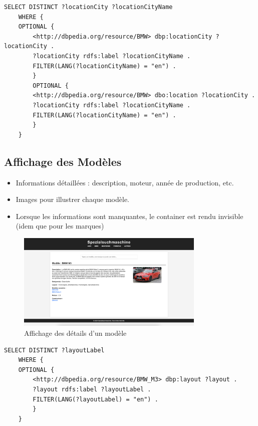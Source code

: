 \documentclass[a4paper]{article}
\begin{document}
\begin{lstlisting}[language=SPARQL, caption=Requêtes SPARQL pour rechercher la ville d'une marque]
    SELECT DISTINCT ?locationCity ?locationCityName
    WHERE {
    OPTIONAL {
        <http://dbpedia.org/resource/BMW> dbp:locationCity ?locationCity .
        ?locationCity rdfs:label ?locationCityName .
        FILTER(LANG(?locationCityName) = "en") .
        }
        OPTIONAL {
        <http://dbpedia.org/resource/BMW> dbo:location ?locationCity .
        ?locationCity rdfs:label ?locationCityName .
        FILTER(LANG(?locationCityName) = "en") .
        }
    }
\end{lstlisting}

\subsection{Affichage des Modèles}
\begin{itemize}
    \item Informations détaillées : description, moteur, année de production, etc.
    \item Images pour illustrer chaque modèle.
    \item Lorsque les informations sont manquantes, le container est rendu invisible (idem que pour les marques)
\end{itemize}

\begin{figure}[H]
    \centering
    \includegraphics[width=0.8\textwidth]{images/modele.png}
    \caption{Affichage des détails d'un modèle}
\end{figure}

\begin{lstlisting}[language=SPARQL, caption=Requêtes SPARQL pour rechercher la configuration d'un modèle]
    SELECT DISTINCT ?layoutLabel
    WHERE {
    OPTIONAL {
        <http://dbpedia.org/resource/BMW_M3> dbp:layout ?layout .
        ?layout rdfs:label ?layoutLabel .
        FILTER(LANG(?layoutLabel) = "en") .
        }
    }
\end{lstlisting}
\end{document}
